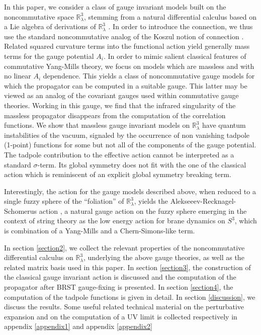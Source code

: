 \documentclass[a4paper,11pt]{article}
\numberwithin{equation}{section}
\theoremstyle{nonumberplain}
\begin{document}
In this paper, we consider a  class of gauge invariant models built on the noncommutative space $\mathbb{R}^3_\lambda$, stemming from a natural differential calculus based on a Lie algebra of derivations of $\mathbb{R}^3_\lambda$ \cite{Marmo:2004re}. In order to introduce the connection, we thus use the standard noncommutative analog of the Koszul notion of connection \cite{Wallet:2008bq, Wallet:2011cmj, Wallet:2008b}. Related squared curvature terms into the functional action yield generally  mass terms for the gauge potential $A_i$. In order to mimic salient classical features of commutative Yang-Mills theory, we focus on models which are massless and with no linear $A_i$ dependence. This yields a class of noncommutative gauge models for which the propagator can be computed in a suitable gauge. This latter may be viewed as an analog of the covariant gauges used within commutative gauge theories. Working in this gauge, we find  that the infrared singularity of the massless propagator disappears from the computation of the correlation functions. We show that massless gauge invariant models on $\mathbb{R}^3_\lambda$ have quantum instabilities of the vacuum, signaled by the occurrence of non vanishing tadpole (1-point) functions for some but not all of the components of the gauge potential. The tadpole contribution to the effective action cannot be interpreted as a standard $\sigma$-term. Its global symmetry does not fit with the one of the classical action which is reminiscent of an explicit global symmetry breaking term.\par 
Interestingly, the action for the gauge models described above, when reduced to a single fuzzy sphere of the ``foliation'' of $\mathbb{R}^3_\lambda$,  yields  the Alekseeev-Recknagel-Schomerus action \cite{ARS00}, a natural gauge action on the fuzzy sphere emerging in the context of string theory as the low energy action for brane dynamics on $S^3$, which is combination of a Yang-Mills and a Chern-Simons-like term. 

In  section \ref{section2}, we collect the relevant properties of the noncommutative differential calculus on $\mathbb{R}^3_\lambda$, underlying the above gauge theories,  as well as the related matrix basis used in this paper. In section \ref{section3}, the construction of the classical gauge invariant action is discussed and the computation of the propagator after BRST gauge-fixing is presented. In section \ref{section4}, the computation of the tadpole functions is given in detail. In section \ref{discussion}, we discuss the results. Some useful related technical material on the perturbative expansion and on the computation of a UV limit is collected respectively in appendix \ref{appendix1} and appendix \ref{appendix2}
\end{document}
